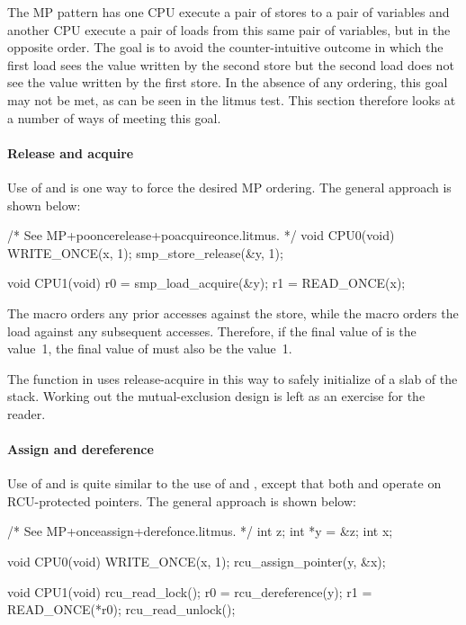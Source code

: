 The MP pattern has one CPU execute a pair of stores to a pair of variables
and another CPU execute a pair of loads from this same pair of variables,
but in the opposite order.
The goal is to avoid the counter-intuitive outcome in which the first load
sees the value written by the second store but the second load does not see
the value written by the first store.
In the absence of any ordering, this goal may not be met, as can be seen
in the  litmus test.
This section therefore looks at a number of ways of meeting this goal.


\paragraph{Release and acquire}

Use of  and  is one way to force
the desired MP ordering.  The general approach is shown below:

\begin{VerbatimU}
	/* See MP+pooncerelease+poacquireonce.litmus. */
	void CPU0(void)
	{
		WRITE_ONCE(x, 1);
		smp_store_release(&y, 1);
	}

	void CPU1(void)
	{
		r0 = smp_load_acquire(&y);
		r1 = READ_ONCE(x);
	}
\end{VerbatimU}

The  macro orders any prior accesses against the
store, while the  macro orders the load against any
subsequent accesses.
Therefore, if the final value of  is the value~1, the final value
of  must also be the value~1.

The  function in  uses
release-acquire in this way to safely initialize of a slab of the stack.
Working out the mutual-exclusion design is left as an exercise for the reader.


\paragraph{Assign and dereference}

Use of  and  is quite similar
to the use of  and , except
that both  and  operate on
RCU-protected pointers.
The general approach is shown below:

\begin{VerbatimU}
	/* See MP+onceassign+derefonce.litmus. */
	int z;
	int *y = &z;
	int x;

	void CPU0(void)
	{
		WRITE_ONCE(x, 1);
		rcu_assign_pointer(y, &x);
	}

	void CPU1(void)
	{
		rcu_read_lock();
		r0 = rcu_dereference(y);
		r1 = READ_ONCE(*r0);
		rcu_read_unlock();
	}
\end{VerbatimU}

